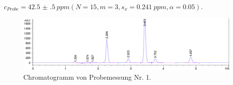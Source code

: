     \noindent $c_{Probe} = \SI[mode=text, multi-part-units = brackets, separate-uncertainty]{42.5(5)}{ppm} \left(N = 15, m = 3, s_x = \SI[mode=text]{0.241}{ppm}, \alpha = 0.05\right)$.
      
      \begin{figure}[H]
        \includegraphics[scale=0.28, center]{images/Probemessung1.png} 
        \caption[Chromatogramm von Probemessung Nr. 1, Quelle: Autor]{Chromatogramm von Probemessung Nr. 1.}
        \label{fig:ChromatogrammProbemessung}
      \end{figure}
    
    
   
    
      